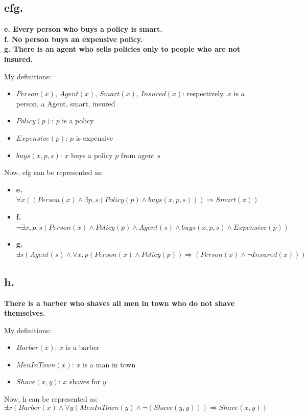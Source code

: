 \documentclass[UTF8]{article}
\newcommand{\jumpLine} {\hspace*{\fill} \par}
\begin{document}
\subsection*{efg.}
\noindent \textbf{e. Every person who buys a policy is smart.}\\
\noindent \textbf{f. No person buys an expensive policy.}\\
\noindent \textbf{g. There is an agent who sells policies only to people who are not insured.}\\\jumpLine\noindent
My definitions:
\begin{itemize}
	\item $Person(x)$, $Agent(x)$, $Smart(x)$, $Insured(x)$: respectively, $x$ is a person, a Agent, smart, insured
	\item $Policy(p)$: $p$ is a policy
	\item $Expensive(p)$: $p$ is expensive
	\item $buys(x,p,s)$: $x$ buys a policy $p$ from agent $s$
\end{itemize}
Now, efg can be represented as:
\begin{itemize}
	\item \textbf{e.} $\forall x ((Person(x) \land \exists p, s (Policy(p) \land buys(x,p,s))) \Rightarrow Smart(x))$
	\item \textbf{f.} $\lnot\exists x,p,s (Person(x)\land Policy(p)\land Agent(s)\land buys(x,p,s)\land Expensive(p))$
	\item \textbf{g.} $\exists s (Agent(s)\land \forall x, p(Person(x)\land Policy(p))\Rightarrow (Person(x)\land \lnot Insured(x)))$
\end{itemize}

\subsection*{h.}
\noindent \textbf{There is a barber who shaves all men in town who do not shave themselves.}\\\jumpLine\noindent
My definitions:
\begin{itemize}
	\item $Barber(x)$: $x$ is a barber
	\item $MenInTown(x)$: $x$ is a man in town
	\item $Shave(x, y)$: $x$ shaves for $y$
\end{itemize}
Now, h can be represented as:
$$\exists x(Barber(x)\land \forall y (MenInTown(y)\land \lnot(Shave(y,y)))\Rightarrow Shave(x, y))$$
\end{document}
